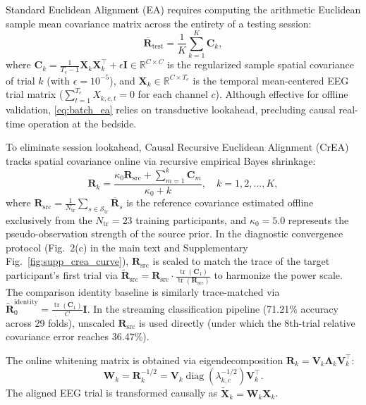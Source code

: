 \documentclass[journal]{IEEEtran}
\begin{document}
Standard Euclidean Alignment (EA) requires computing the arithmetic Euclidean sample mean covariance matrix across the entirety of a testing session:
\begin{equation}
\overline{\mathbf{R}}_{\mathrm{test}} = \frac{1}{K} \sum_{k=1}^K \mathbf{C}_k,
\label{eq:batch_ea}
\end{equation}
where $\mathbf{C}_k = \frac{1}{T_e - 1} \mathbf{X}_k \mathbf{X}_k^\top + \epsilon \mathbf{I} \in \mathbb{R}^{C \times C}$ is the regularized sample spatial covariance of trial $k$ (with $\epsilon = 10^{-5}$), and $\mathbf{X}_k \in \mathbb{R}^{C \times T_e}$ is the temporal mean-centered EEG trial matrix ($\sum_{t=1}^{T_e} X_{k,c,t} = 0$ for each channel $c$). Although effective for offline validation, \eqref{eq:batch_ea} relies on transductive lookahead, precluding causal real-time operation at the bedside.

To eliminate session lookahead, Causal Recursive Euclidean Alignment (CrEA) tracks spatial covariance online via recursive empirical Bayes shrinkage:
\begin{equation}
\mathbf{R}_k = \frac{\kappa_0 \mathbf{R}_{\mathrm{src}} + \sum_{m=1}^k \mathbf{C}_m}{\kappa_0 + k}, \quad k = 1, 2, \dots, K,
\label{eq:supp_crea}
\end{equation}
where $\mathbf{R}_{\mathrm{src}} = \frac{1}{N_{\mathrm{tr}}} \sum_{s \in \mathcal{S}_{\mathrm{tr}}} \overline{\mathbf{R}}_s$ is the reference covariance estimated offline exclusively from the $N_{\mathrm{tr}} = 23$ training participants, and $\kappa_0 = 5.0$ represents the pseudo-observation strength of the source prior. In the diagnostic convergence protocol (Fig.~2(c) in the main text and Supplementary Fig.~\ref{fig:supp_crea_curve}), $\mathbf{R}_{\mathrm{src}}$ is scaled to match the trace of the target participant's first trial via $\widetilde{\mathbf{R}}_{\mathrm{src}} = \mathbf{R}_{\mathrm{src}} \cdot \frac{\operatorname{tr}(\mathbf{C}_1)}{\operatorname{tr}(\mathbf{R}_{\mathrm{src}})}$ to harmonize the power scale. The comparison identity baseline is similarly trace-matched via $\widetilde{\mathbf{R}}_0^{\mathrm{identity}} = \frac{\operatorname{tr}(\mathbf{C}_1)}{C} \mathbf{I}$. In the streaming classification pipeline (71.21\% accuracy across 29 folds), unscaled $\mathbf{R}_{\mathrm{src}}$ is used directly (under which the 8th-trial relative covariance error reaches 36.47\%).

The online whitening matrix is obtained via eigendecomposition $\mathbf{R}_k = \mathbf{V}_k \boldsymbol{\Lambda}_k \mathbf{V}_k^\top$:
\begin{equation}
\mathbf{W}_k = \mathbf{R}_k^{-1/2} = \mathbf{V}_k \operatorname{diag}\left(\lambda_{k,c}^{-1/2}\right) \mathbf{V}_k^\top.
\label{eq:whitening}
\end{equation}
The aligned EEG trial is transformed causally as $\widetilde{\mathbf{X}}_k = \mathbf{W}_k \mathbf{X}_k$.
\end{document}
